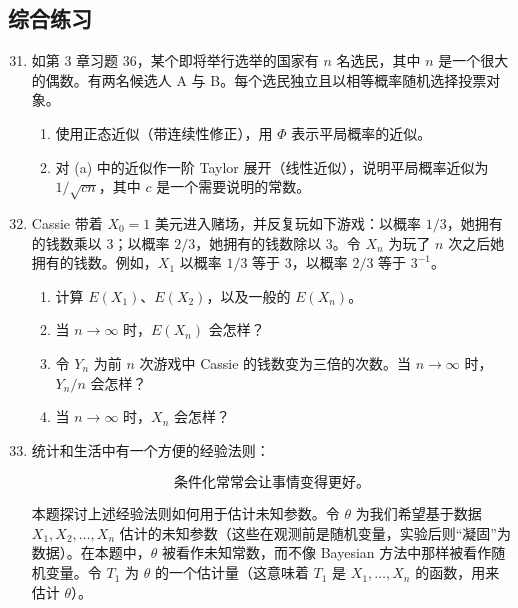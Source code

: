 \documentclass[UTF8, 12pt, fontset=fandol, oneside]{ctexart}
\begin{document}
\subsection*{综合练习}

\begin{enumerate}
  \setcounter{enumi}{30}
  \item 如第 3 章习题 36，某个即将举行选举的国家有 $n$ 名选民，其中 $n$ 是一个很大的偶数。有两名候选人 A 与 B。每个选民独立且以相等概率随机选择投票对象。
  \begin{enumerate}
    \item 使用正态近似（带连续性修正），用 $\Phi$ 表示平局概率的近似。
    \item 对 (a) 中的近似作一阶 Taylor 展开（线性近似），说明平局概率近似为 $1/\sqrt{cn}$，其中 $c$ 是一个需要说明的常数。
  \end{enumerate}

  \item Cassie 带着 $X_0=1$ 美元进入赌场，并反复玩如下游戏：以概率 $1/3$，她拥有的钱数乘以 $3$；以概率 $2/3$，她拥有的钱数除以 $3$。令 $X_n$ 为玩了 $n$ 次之后她拥有的钱数。例如，$X_1$ 以概率 $1/3$ 等于 $3$，以概率 $2/3$ 等于 $3^{-1}$。
  \begin{enumerate}
    \item 计算 $E(X_1)$、$E(X_2)$，以及一般的 $E(X_n)$。
    \item 当 $n\to\infty$ 时，$E(X_n)$ 会怎样？
    \item 令 $Y_n$ 为前 $n$ 次游戏中 Cassie 的钱数变为三倍的次数。当 $n\to\infty$ 时，$Y_n/n$ 会怎样？
    \item 当 $n\to\infty$ 时，$X_n$ 会怎样？
  \end{enumerate}

  \item 统计和生活中有一个方便的经验法则：

  \[
    \text{条件化常常会让事情变得更好。}
  \]

  本题探讨上述经验法则如何用于估计未知参数。令 $\theta$ 为我们希望基于数据 $X_1,X_2,\ldots,X_n$ 估计的未知参数（这些在观测前是随机变量，实验后则“凝固”为数据）。在本题中，$\theta$ 被看作未知常数，而不像 Bayesian 方法中那样被看作随机变量。令 $T_1$ 为 $\theta$ 的一个估计量（这意味着 $T_1$ 是 $X_1,\ldots,X_n$ 的函数，用来估计 $\theta$）。


\end{enumerate}
\end{document}
